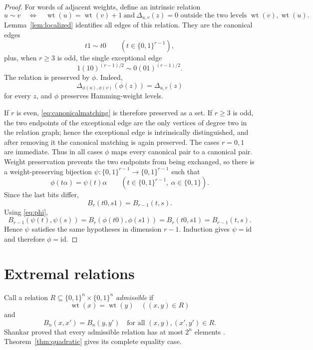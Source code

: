 \documentclass[11pt]{article}
\theoremstyle{definition}
\newcommand{\wt}{\operatorname{wt}}
\newcommand{\bits}{\{0,1\}}
\begin{document}
\begin{proof}
For words of adjacent weights, define an intrinsic relation
\[
 u\sim v
 \quad\Longleftrightarrow\quad
 \wt(u)=\wt(v)+1
 \ \text{and}\ 
 \Delta_{u,v}(z)=0
 \text{ outside the two levels }\wt(v),\wt(u).
\]
Lemma~\ref{lem:localized} identifies all edges of this relation.  They are the canonical edges
\begin{equation}\label{eq:canonicalmatching}
 t1\sim t0\qquad(t\in\bits^{r-1}),
\end{equation}
plus, when $r\ge3$ is odd, the single exceptional edge
\[
 1(10)^{(r-1)/2}\sim0(01)^{(r-1)/2}.
\]
The relation is preserved by $\phi$.  Indeed,
\[
 \Delta_{\phi(u),\phi(v)}(\phi(z))
 =\Delta_{u,v}(z)
\]
for every $z$, and $\phi$ preserves Hamming-weight levels.

If $r$ is even, \eqref{eq:canonicalmatching} is therefore preserved as a set.  If $r\ge3$ is odd, the two endpoints of the exceptional edge are the only vertices of degree two in the relation graph; hence the exceptional edge is intrinsically distinguished, and after removing it the canonical matching is again preserved.  The cases $r=0,1$ are immediate.  Thus in all cases $\phi$ maps every canonical pair to a canonical pair.  Weight preservation prevents the two endpoints from being exchanged, so there is a weight-preserving bijection $\psi:\bits^{r-1}\to\bits^{r-1}$ such that
\[
 \phi(t\alpha)=\psi(t)\alpha
 \qquad(t\in\bits^{r-1},\ \alpha\in\bits).
\]
Since the last bits differ,
\[
 B_r(t0,s1)=B_{r-1}(t,s).
\]
Using \eqref{eq:phi},
\[
 B_{r-1}(\psi(t),\psi(s))
 =B_r(\phi(t0),\phi(s1))
 =B_r(t0,s1)
 =B_{r-1}(t,s).
\]
Hence $\psi$ satisfies the same hypotheses in dimension $r-1$.  Induction gives $\psi=\mathrm{id}$ and therefore $\phi=\mathrm{id}$.
\end{proof}

\section{Extremal relations}

Call a relation $R\subseteq\bits^n\times\bits^n$ \emph{admissible} if
\begin{equation}\label{eq:admissible}
 \wt(x)=\wt(y)\quad((x,y)\in R)
\end{equation}
and
\begin{equation}\label{eq:admissibleB}
 B_n(x,x')=B_n(y,y')
 \quad\text{for all }(x,y),(x',y')\in R.
\end{equation}
Shankar proved that every admissible relation has at most $2^n$ elements \cite[Lemma~2.2]{Shankar}.  Theorem~\ref{thm:quadratic} gives its complete equality case.
\end{document}
